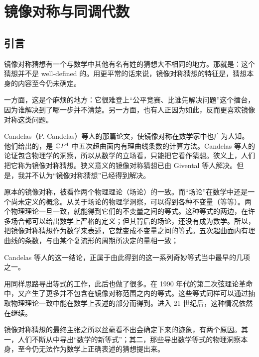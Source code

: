 \renewcommand{\thesection}{\arabic{section}}
\chapter{镜像对称与同调代数}

\section{引言}

镜像对称猜想有一个与数学中其他有名有姓的猜想大不相同的地方。那就是：这个猜想并不是 well-defined 的。用更平常的话来说，镜像对称猜想的特征是，猜想本身的内容至今仍未确定。

一方面，这是个麻烦的地方：它很难登上“公平竞赛、比谁先解决问题”这个擂台，因为谁解决到了哪一步并不清楚。另一方面，也有人正因为如此，反而更喜欢镜像对称这类问题。

Candelas（P. Candelas）等人的那篇论文，使镜像对称在数学家中也广为人知。他们给出的，是 $\mathbb{C}P^4$ 中五次超曲面内有理曲线条数的计算方法。Candelas 等人的论证包含物理学的洞察，所以从数学的立场看，只能把它看作猜想。狭义上，人们把它称为镜像对称猜想。狭义意义的镜像对称猜想已由 Givental 等人解决。但是，我并不认为“镜像对称猜想”已经得到解决。

原本的镜像对称，被看作两个物理理论（场论）的一致。而“场论”在数学中还是一个尚未定义的概念。从关于场论的物理学洞察，可以得到各种不变量（等等）。两个物理理论一旦一致，就能得到它们的不变量之间的等式。这种等式的两边，在许多场合都可以给出数学上严格的定义；但其背后的场论，还没有成为数学。所以，把镜像对称猜想作为数学来表述，它就变成不变量之间的等式。五次超曲面内有理曲线的条数，与由某个复流形的周期所决定的量相一致；

Candelas 等人的这一结论，正属于由此得到的这一系列奇妙等式当中最早的几项之一。

用同样思路导出等式的工作，此后也做了很多。在 1990 年代的第二次弦理论革命中，又产生了更多并不包含在镜像对称范围之内的等式。这些等式同样可以通过抽取物理理论一致中能在数学上表述的部分而得到。进入 21 世纪后，这种情况依然在继续。

镜像对称猜想的最终主张之所以丝毫看不出会确定下来的迹象，有两个原因。其一，人们不断从中导出“数学的新等式”；其二，那些导出数学等式的物理洞察本身，至今仍无法作为数学上正确表述的猜想提出来。

